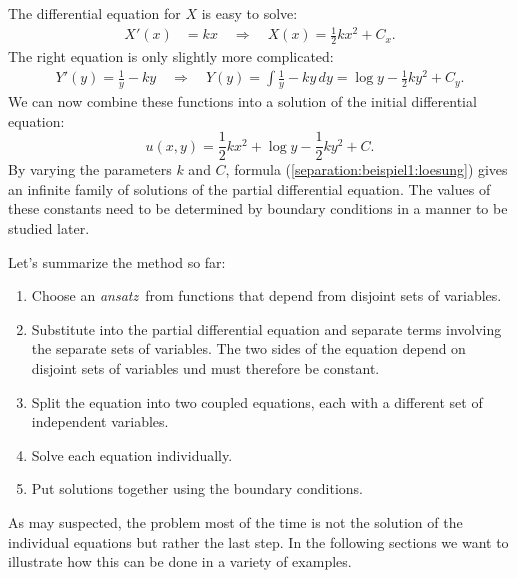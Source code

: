 The differential equation for $X$ is easy to solve:
\begin{align*}
X'(x)&=kx\quad\Rightarrow\quad X(x)=
\frac12kx^2+C_x.
\end{align*}
The right equation is only slightly more complicated:
\begin{align*}
Y'(y)=\frac1y-ky
\quad\Rightarrow\quad
Y(y)=\int\frac1y-ky\,dy=
\log y-\frac12ky^2+C_y.
\end{align*}
We can now combine these functions into a solution of the initial
differential equation:
\begin{equation}
u(x,y)=
\frac12kx^2+
\log y-\frac12ky^2+C.
\label{separation:beispiel1:loesung}
\end{equation}
By varying the parameters $k$ and $C$, formula
(\ref{separation:beispiel1:loesung}) gives an infinite family of
solutions of the partial differential equation.
The values of these constants need to be determined by boundary conditions
in a manner to be studied later.

Let's summarize the method so far:
\begin{enumerate}
\item
Choose an {\em ansatz} from functions that depend from disjoint
sets of variables.
\item
Substitute into the partial differential equation and separate terms
involving the separate sets of variables.
The two sides of the equation depend on disjoint sets of variables
und must therefore be constant.
\item 
Split the equation into two coupled equations, each with a
different set of independent variables.
\item
Solve each equation individually.
\item
Put solutions together using the boundary conditions.
\end{enumerate}
As may suspected, the problem most of the time is not the solution
of the individual equations but rather the last step.
In the following sections we want to illustrate how this can be
done in a variety of examples.

